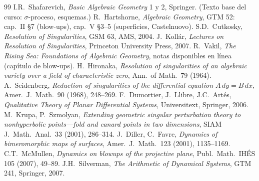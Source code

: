 \documentclass[11pt,a4paper]{article}
\theoremstyle{plain}
\theoremstyle{definition}
\theoremstyle{remark}
\begin{document}
\renewcommand{\refname}{Bibliografía}
\begin{thebibliography}{99}
 I.R.~Shafarevich, \emph{Basic Algebraic Geometry} 1 y 2, Springer. (Texto base del curso: $\sigma$-proceso, esquemas.)
 R.~Hartshorne, \emph{Algebraic Geometry}, GTM 52: cap.~II \S7 (blow-ups), cap.~V \S3--5 (superficies, Castelnuovo).
 S.D.~Cutkosky, \emph{Resolution of Singularities}, GSM 63, AMS, 2004.
 J.~Kollár, \emph{Lectures on Resolution of Singularities}, Princeton University Press, 2007.
 R.~Vakil, \emph{The Rising Sea: Foundations of Algebraic Geometry}, notas disponibles en línea (capítulo de blow-ups).
 H.~Hironaka, \emph{Resolution of singularities of an algebraic variety over a field of characteristic zero}, Ann.\ of Math.\ 79 (1964).
 A.~Seidenberg, \emph{Reduction of singularities of the differential equation $A\,dy=B\,dx$}, Amer.\ J.\ Math.\ 90 (1968), 248--269.
 F.~Dumortier, J.~Llibre, J.C.~Artés, \emph{Qualitative Theory of Planar Differential Systems}, Universitext, Springer, 2006.
 M.~Krupa, P.~Szmolyan, \emph{Extending geometric singular perturbation theory to nonhyperbolic points---fold and canard points in two dimensions}, SIAM J.\ Math.\ Anal.\ 33 (2001), 286--314.
 J.~Diller, C.~Favre, \emph{Dynamics of bimeromorphic maps of surfaces}, Amer.\ J.\ Math.\ 123 (2001), 1135--1169.
 C.T.~McMullen, \emph{Dynamics on blowups of the projective plane}, Publ.\ Math.\ IHÉS 105 (2007), 49--89.
 J.H.~Silverman, \emph{The Arithmetic of Dynamical Systems}, GTM 241, Springer, 2007.
\end{thebibliography}
\end{document}
